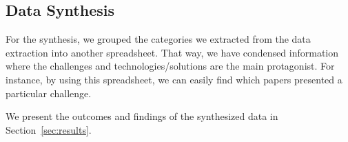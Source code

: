\subsection{Data Synthesis}


For the synthesis, we grouped the categories we extracted from the data extraction into another spreadsheet. That way, we have condensed information where the challenges and technologies/solutions are the main protagonist. For instance, by using this spreadsheet, we can easily find which papers presented a particular challenge. 

We present the outcomes and findings of the synthesized data in Section~\ref{sec:results}.


